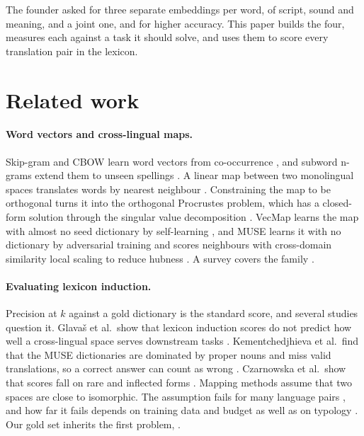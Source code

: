 \documentclass[11pt]{article}
\begin{document}
The founder asked for three separate embeddings per word, of script, sound and meaning, and a joint one, and for higher accuracy. This paper builds the four, measures each against a task it should solve, and uses them to score every translation pair in the lexicon.

\section{Related work}
\label{sec:related}

\paragraph{Word vectors and cross-lingual maps.} Skip-gram and CBOW learn word vectors from co-occurrence \cite{mikolov2013efficient,mikolov2013distributed}, and subword n-grams extend them to unseen spellings \cite{bojanowski2016fasttext}. A linear map between two monolingual spaces translates words by nearest neighbour \cite{mikolov2013exploiting}. Constraining the map to be orthogonal turns it into the orthogonal Procrustes problem, which has a closed-form solution through the singular value decomposition \cite{schonemann1966procrustes,xing2015normalized,smith2017offline,artetxe2016learning}. VecMap learns the map with almost no seed dictionary by self-learning \cite{artetxe2018robust}, and MUSE learns it with no dictionary by adversarial training and scores neighbours with cross-domain similarity local scaling to reduce hubness \cite{conneau2017muse,dinu2014hubness}. A survey covers the family \cite{ruder2019survey}.

\paragraph{Evaluating lexicon induction.} Precision at $k$ against a gold dictionary is the standard score, and several studies question it. Glava\v{s} et al.\ show that lexicon induction scores do not predict how well a cross-lingual space serves downstream tasks \cite{glavas2019evaluate}. Kementchedjhieva et al.\ find that the MUSE dictionaries are dominated by proper nouns and miss valid translations, so a correct answer can count as wrong \cite{kementchedjhieva2019lost}. Czarnowska et al.\ show that scores fall on rare and inflected forms \cite{czarnowska2019longtail}. Mapping methods assume that two spaces are close to isomorphic. The assumption fails for many language pairs \cite{sogaard2018limitations}, and how far it fails depends on training data and budget as well as on typology \cite{vulic2020isomorphic}. Our gold set inherits the first problem, .
\end{document}
